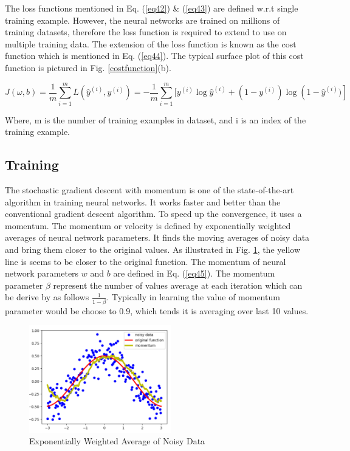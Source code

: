 The loss functions mentioned in Eq. (\ref{eq42}) \& (\ref{eq43}) are defined w.r.t single training example. However, the neural networks are trained on millions of training datasets, therefore the loss function is required to extend to use on multiple training data. The extension of the loss function is known as the cost function which is mentioned in Eq. (\ref{eq44}). The typical surface plot of this cost function is pictured in Fig. \ref{costfunction}(b).    

\begin{equation}
    J(\omega, b)=\frac{1}{m} \sum_{i=1}^{m} L\left(\hat{y}^{(i)}, y^{(i)}\right)=-\frac{1}{m} \sum_{i=1}^{m} [y^{(i)} \log \hat{y}^{(i)}+\left(1-y^{(i)}\right) \log \left(1 - \hat{y}^{(i)})\right]
    \label{eq44}
\end{equation}

Where, m is the number of training examples in dataset, and i is an index of the training example.  

\subsection{Training}
The stochastic gradient descent with momentum is one of the state-of-the-art algorithm in training neural networks. It works faster and better than the conventional gradient descent algorithm. To speed up the convergence, it uses a momentum. The momentum or velocity is defined by exponentially weighted averages of neural network parameters. It finds the moving averages of noisy data and bring them closer to the original values. As illustrated in Fig. \ref{movingaverage}, the yellow line is seems to be closer to the original function. The momentum of neural network parameters $w$ and $b$ are defined in Eq. (\ref{eq45}). The momentum parameter $\beta$ represent the number of values average at each iteration which can be derive by as follows $\frac{1}{1-\beta}$. Typically in learning the value of momentum parameter would be choose to 0.9, which tends it is averaging over last 10 values.

\begin{figure}
    \centering
    \includegraphics[width=0.55\textwidth]{Images/movingaverage.png}
    \caption{Exponentially Weighted Average of Noisy Data \cite{gradientdescent}}
    \label{movingaverage}
\end{figure} 

